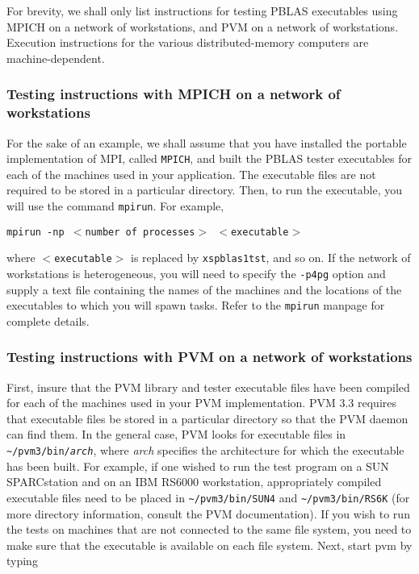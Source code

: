 \documentclass[11pt]{report}
\begin{document}
For brevity, we shall only list instructions for testing PBLAS
executables using MPICH on a network of workstations, and PVM on
a network of workstations.  Execution instructions for the various
distributed-memory computers are machine-dependent.

\subsubsection*{Testing instructions with MPICH on a network of workstations}

For the sake of an example, we shall assume that you have installed the
portable implementation of MPI, called {\tt MPICH}, and built the
PBLAS tester executables for each of the machines used in your 
application.  The executable files are not required to be stored in
a particular directory.  Then, to run the executable, you will use
the command {\tt mpirun}.  For example,
 
\begin{list}{}{}
\item{\tt mpirun -np $<$number of processes$>$~$<$executable$>$}
\end{list}
 
where {\tt $<$executable$>$} is replaced by {\tt xspblas1tst}, and so on.
If the network of workstations is heterogeneous, you will need to
specify the {\tt -p4pg} option and supply a text file containing the names
of the machines and the locations of the executables to which you
will spawn tasks.  Refer to the {\tt mpirun} manpage for complete details.

\subsubsection*{Testing instructions with PVM on a network of workstations}

First, insure that the PVM library and tester executable files have been
compiled for each of the machines used in your PVM implementation.  
PVM 3.3 requires that executable files be stored in a particular
directory so that the PVM daemon can find them.  In the general
case, PVM looks for executable files in {\tt \~{}/pvm3/bin/\em{}arch},
where {\em{}arch} specifies the architecture for which the executable
has been built.  For example, if one wished to run the test
program on a SUN SPARCstation and on an IBM RS6000 workstation,
appropriately compiled executable files need to be placed in
{\tt \~{}/pvm3/bin/SUN4} and {\tt{}\~{}/pvm3/bin/RS6K} (for
more directory information, consult the PVM documentation).
If you wish to run the tests on machines that are not connected to
the same file system, you need to make sure that the executable
is available on each file system.
Next, start pvm by typing
\end{document}
